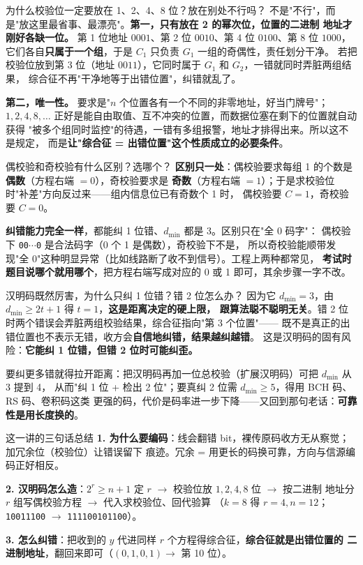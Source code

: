 \begin{qa}{为什么校验位一定要放在 1、2、4、8 位？放在别处不行吗？}
不是"不行"，而是"放这里最省事、最漂亮"。\textbf{第一，只有放在 2 的幂次位，位置的二进制
地址才刚好各缺一位。} 第 1 位地址 $0001$、第 2 位 $0010$、第 4 位 $0100$、第 8 位 $1000$，
它们各自\textbf{只属于一个组}，于是 $C_1$ 只负责 $G_1$ 一组的奇偶性，责任划分干净。
若把校验位放到第 3 位（地址 $0011$），它同时属于 $G_1$ 和 $G_2$，一错就同时弄脏两组结果，
综合征不再"干净地等于出错位置"，纠错就乱了。

\textbf{第二，唯一性。} 要求是"$n$ 个位置各有一个不同的非零地址，好当门牌号"；
$1,2,4,8,\dots$ 正好是能自由取值、互不冲突的位置，而数据位塞在剩下的位置就自动获得
"被多个组同时监控"的待遇，一错有多组报警，地址才排得出来。所以这不是规定，
而是\textbf{让"综合征 = 出错位置"这个性质成立的必要条件}。
\end{qa}

\begin{qa}{偶校验和奇校验有什么区别？选哪个？}
\textbf{区别只一处}：偶校验要求每组 1 的个数是\textbf{偶数}（方程右端 $=0$），奇校验要求是
\textbf{奇数}（方程右端 $=1$）；于是求校验位时"补差"方向反过来——组内信息位已有奇数个 1 时，
偶校验要 $C=1$，奇校验要 $C=0$。

\textbf{纠错能力完全一样}，都能纠 1 位错、$d_{\min}$ 都是 3。区别只在"全 0 码字"：
偶校验下 \texttt{00}$\cdots$\texttt{0} 是合法码字（0 个 1 是偶数），奇校验下不是，
所以奇校验能顺带发现"全 0"这种明显异常（比如线路断了收不到信号）。工程上两种都常见，
\textbf{考试时题目说哪个就用哪个}，把方程右端写成对应的 0 或 1 即可，其余步骤一字不改。
\end{qa}

\begin{qa}{汉明码既然厉害，为什么只纠 1 位错？错 2 位怎么办？}
因为它 $d_{\min}=3$，由 $d_{\min}\ge2t+1$ 得 $t=1$，\textbf{这是距离决定的硬上限，
跟算法聪不聪明无关}。错 2 位时两个错误会弄脏两组校验结果，综合征指向"第 3 个位置"——
既不是真正的出错位置也不表示无错，收方会\textbf{自信地纠错，结果越纠越错}。
这是汉明码的固有风险：\textbf{它能纠 1 位错，但错 2 位时可能纠歪。}

要纠更多错就得拉开距离：把汉明码再加一位总校验（扩展汉明码）可把 $d_{\min}$ 从 3 提到 4，
从而"纠 1 位 + 检出 2 位"；要真纠 2 位需 $d_{\min}\ge5$，得用 BCH 码、RS 码、卷积码这类
更强的码，代价是码率进一步下降——又回到那句老话：\textbf{可靠性是用长度换的}。
\end{qa}

\begin{idea}{这一讲的三句话总结}
\textbf{1. 为什么要编码}：线会翻错 bit，裸传原码收方无从察觉；加冗余位（校验位）让错误留下
痕迹。冗余 = 用更长的码换可靠，方向与信源编码正好相反。

\textbf{2. 汉明码怎么造}：$2^{r}\ge n+1$ 定 $r$ $\to$ 校验位放 $1,2,4,8$ 位 $\to$ 按二进制
地址分 $r$ 组写偶校验方程 $\to$ 代入求校验位、回代验算
（$k=8$ 得 $r=4,n=12$；\texttt{10011100} $\to$ \texttt{111100101100}）。

\textbf{3. 怎么纠错}：把收到的 $y$ 代进同样 $r$ 个方程得综合征，\textbf{综合征就是出错位置的
二进制地址}，翻回来即可（$(0,1,0,1)\to$ 第 10 位）。
\end{idea}
